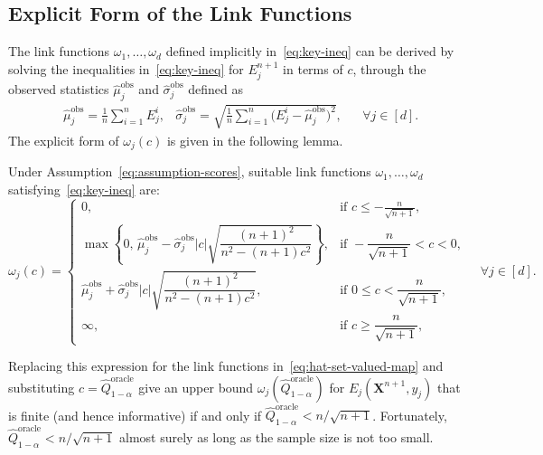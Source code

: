 \subsection{Explicit Form of the Link Functions}
The link functions $\omega_1, \ldots, \omega_d$ defined implicitly in~\eqref{eq:key-ineq} can be derived by solving the inequalities in~\eqref{eq:key-ineq} for ${E}^{n+1}_j$ in terms of $c$, through the observed statistics $\hat{\mu}^\mathrm{obs}_j$ and $\hat{\sigma}^\mathrm{obs}_j$ defined as
\begin{equation} \label{eq:plug-in-mean-std}
\begin{aligned}
& \hat{\mu}^\mathrm{obs}_j = \frac{1}{n} \sum_{i=1}^{n} {E}^i_j,
& \hat{\sigma}^\mathrm{obs}_j =  \sqrt{\frac{1}{n} \sum_{i=1}^{n} \!\bigl({E}^i_j - \hat{\mu}^\mathrm{obs}_j\bigr)^2},
&& \forall j \in [d].
\end{aligned}
\end{equation}
The explicit form of $\omega_j(c)$ is given in the following lemma.

\begin{lemma}\label{lem:solution-key-ineq}
Under Assumption~\ref{eq:assumption-scores}, suitable link functions $\omega_1, \ldots ,\omega_d$ satisfying~\eqref{eq:key-ineq} are:
\[
    \omega_j(c)
    =
    \begin{cases}
    0, & \text{if } c \leq -\frac{n}{\sqrt{n+1}},\\
    \max\!\left\{0,\,
    \hat{\mu}^\mathrm{obs}_j - \hat{\sigma}^\mathrm{obs}_j |c|
    \sqrt{\dfrac{(n+1)^2}{n^2 - (n+1)c^2}}\right\},
    & \text{if } -\dfrac{n}{\sqrt{n+1}} < c < 0, \\[1.1em]
    \hat{\mu}^\mathrm{obs}_j + \hat{\sigma}^\mathrm{obs}_j |c|
    \sqrt{\dfrac{(n+1)^2}{n^2 - (n+1)c^2}},
    & \text{if } 0 \le c < \dfrac{n}{\sqrt{n+1}}, \\[1.1em]
    \infty, & \text{if } c \ge \dfrac{n}{\sqrt{n+1}},
    \end{cases}\quad\forall j \in [d].
\]
\end{lemma}

Replacing this expression for the link functions in~\eqref{eq:hat-set-valued-map} and substituting $c = \hat{Q}^{\mathrm{oracle}}_{1-\alpha}$ give an upper bound $\omega_j(\hat{Q}^{\mathrm{oracle}}_{1-\alpha})$ for $E_j(\mathbf{X}^{n+1}, y_j)$ that is finite (and hence informative) if and only if $\hat{Q}^{\mathrm{oracle}}_{1-\alpha} <n/\sqrt{n+1}$. Fortunately, $\hat{Q}^{\mathrm{oracle}}_{1-\alpha} <n/\sqrt{n+1}$ almost surely as long as the sample size is not too small.

